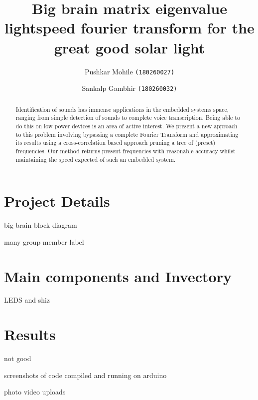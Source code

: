 \documentclass{llncs}
\title{Big brain matrix eigenvalue lightspeed fourier transform for the great good solar light }
\author{Pushkar Mohile \texttt{(180260027)}\inst{1} \and Sankalp Gambhir \texttt{(180260032)}\inst{1}}
\institute{Indian Institute of Technology, Bombay}
\begin{document}
\maketitle

\begin{abstract}
Identification of sounds has immense applications in the embedded systems space,
ranging from simple detection of sounds to complete voice transcription. Being
able to do this on low power devices is an area of active interest. We present a
new approach to this problem involving bypassing a complete Fourier Transform
and approximating its results using a cross-correlation based approach pruning a
tree of (preset) frequencies. Our method returns present frequencies with
reasonable accuracy whilst maintaining the speed expected of such an embedded
system.
\end{abstract}

\section{Project Details}
 big brain block diagram

 many group member label

\section{Main components and Invectory}
 LEDS and shiz

\section{Results}
 not good

 screenshots of code compiled and running on arduino
 
 photo video uploads

\newpage

\end{document}
